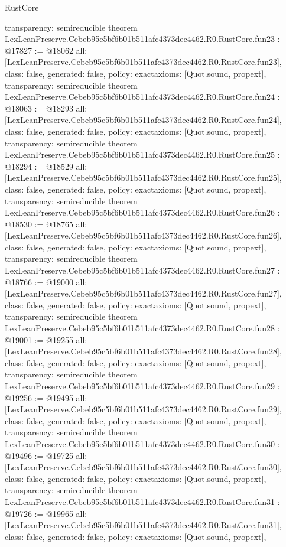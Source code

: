 \begin{lexlean}{RustCore}
\begin{coremodule}
{  transparency: semireducible
}
theorem LexLeanPreserve.Cebeb95c5bf6b01b511afc4373dec4462.R0.RustCore.fun23 : @17827 := @18062 {
  all: [LexLeanPreserve.Cebeb95c5bf6b01b511afc4373dec4462.R0.RustCore.fun23],
  class: false,
  generated: false,
  policy: exact{axioms: [Quot.sound, propext]},
  transparency: semireducible
}
theorem LexLeanPreserve.Cebeb95c5bf6b01b511afc4373dec4462.R0.RustCore.fun24 : @18063 := @18293 {
  all: [LexLeanPreserve.Cebeb95c5bf6b01b511afc4373dec4462.R0.RustCore.fun24],
  class: false,
  generated: false,
  policy: exact{axioms: [Quot.sound, propext]},
  transparency: semireducible
}
theorem LexLeanPreserve.Cebeb95c5bf6b01b511afc4373dec4462.R0.RustCore.fun25 : @18294 := @18529 {
  all: [LexLeanPreserve.Cebeb95c5bf6b01b511afc4373dec4462.R0.RustCore.fun25],
  class: false,
  generated: false,
  policy: exact{axioms: [Quot.sound, propext]},
  transparency: semireducible
}
theorem LexLeanPreserve.Cebeb95c5bf6b01b511afc4373dec4462.R0.RustCore.fun26 : @18530 := @18765 {
  all: [LexLeanPreserve.Cebeb95c5bf6b01b511afc4373dec4462.R0.RustCore.fun26],
  class: false,
  generated: false,
  policy: exact{axioms: [Quot.sound, propext]},
  transparency: semireducible
}
theorem LexLeanPreserve.Cebeb95c5bf6b01b511afc4373dec4462.R0.RustCore.fun27 : @18766 := @19000 {
  all: [LexLeanPreserve.Cebeb95c5bf6b01b511afc4373dec4462.R0.RustCore.fun27],
  class: false,
  generated: false,
  policy: exact{axioms: [Quot.sound, propext]},
  transparency: semireducible
}
theorem LexLeanPreserve.Cebeb95c5bf6b01b511afc4373dec4462.R0.RustCore.fun28 : @19001 := @19255 {
  all: [LexLeanPreserve.Cebeb95c5bf6b01b511afc4373dec4462.R0.RustCore.fun28],
  class: false,
  generated: false,
  policy: exact{axioms: [Quot.sound, propext]},
  transparency: semireducible
}
theorem LexLeanPreserve.Cebeb95c5bf6b01b511afc4373dec4462.R0.RustCore.fun29 : @19256 := @19495 {
  all: [LexLeanPreserve.Cebeb95c5bf6b01b511afc4373dec4462.R0.RustCore.fun29],
  class: false,
  generated: false,
  policy: exact{axioms: [Quot.sound, propext]},
  transparency: semireducible
}
theorem LexLeanPreserve.Cebeb95c5bf6b01b511afc4373dec4462.R0.RustCore.fun30 : @19496 := @19725 {
  all: [LexLeanPreserve.Cebeb95c5bf6b01b511afc4373dec4462.R0.RustCore.fun30],
  class: false,
  generated: false,
  policy: exact{axioms: [Quot.sound, propext]},
  transparency: semireducible
}
theorem LexLeanPreserve.Cebeb95c5bf6b01b511afc4373dec4462.R0.RustCore.fun31 : @19726 := @19965 {
  all: [LexLeanPreserve.Cebeb95c5bf6b01b511afc4373dec4462.R0.RustCore.fun31],
  class: false,
  generated: false,
  policy: exact{axioms: [Quot.sound, propext]},
}
\end{coremodule}
\end{lexlean}
